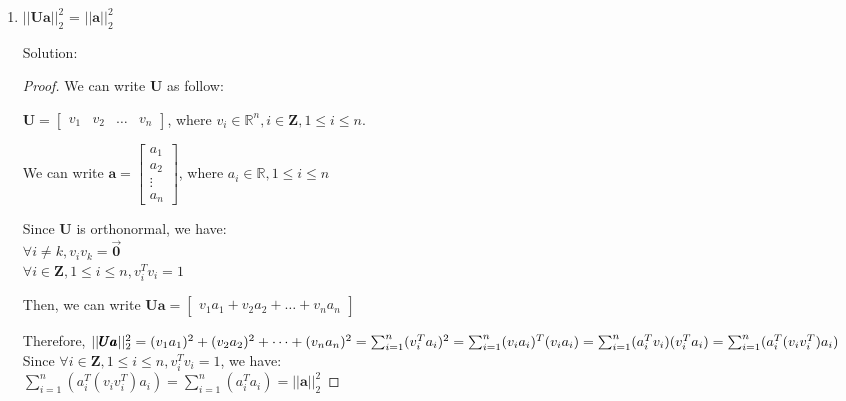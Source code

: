 \documentclass[12pt]{article}
\newcommand{\solu}{{\color{blue} Solution:}}
\newcommand{\Rbb}{\mathbb{R}}
\newcommand{\Z}{\mathbf{Z}}
\newcommand{\Upmb}{\pmb{U}}
\begin{document}
\begin{enumerate}
\begin{enumerate}
\begin{proof}
                        Therefore, trace($\pmb{a}\pmb{a}^T$) = $a_1 \cdot a_1 + a_2 \cdot a_2 + \cdots + a_n \cdot a_n$ = $\sum_{i = 1}^{n} a_i^2$ = $||\pmb{a}||^2_2$

                        Thus, trace($\pmb{a}\pmb{a}^T$) = $||\pmb{a}||^2_2$
                    \end{proof}

              \item $||\Upmb \pmb{a}||_2^2$ = $||\pmb{a}||_2^2$

                    \solu
                    \begin{proof}

                        We can write $\Upmb$ as follow:

                        $
                            \Upmb =
                            \begin{bmatrix}
                                v_1 & v_2 & \dots & v_n
                            \end{bmatrix}
                        $, where $v_i \in \Rbb^n, i\in \Z, 1 \le i \le n$.

                        We can write $\pmb{a} = \begin{bmatrix}
                            a_1 \\ a_2 \\ \vdots \\ a_n
                        \end{bmatrix}$, where $a_i \in \Rbb, 1 \le i \le n$

                        Since $\Upmb$ is orthonormal, we have:\\
                        $\forall i \ne k, v_iv_k = \overrightarrow{\pmb{0}}$\\
                        $\forall i\in \Z, 1 \le i \le n, v_i^T v_i = 1$

                        Then, we can write $\Upmb\pmb{a} =
                            \begin{bmatrix}
                                v_1a_1 + v_2a_2 + \dots + v_na_n
                            \end{bmatrix}$

                        Therefore, $||\Upmb\pmb{a}||^2_2 = (v_1a_1)^2 + (v_2a_2)^2 + \dots + (v_na_n)^2 \\
                            = \sum_{i = 1}^n (v_i^Ta_i)^2 = \sum_{i = 1}^n (v_ia_i)^T(v_ia_i) = \sum_{i = 1}^n (a_i^Tv_i)(v_i^Ta_i) \\
                            = \sum_{i = 1}^n (a_i^T(v_iv_i^T)a_i)$ \\
                        Since $\forall i\in \Z, 1 \le i \le n, v_i^T v_i = 1$, we have:\\
                        $\sum_{i = 1}^n (a_i^T(v_iv_i^T)a_i) = \sum_{i = 1}^n (a_i^Ta_i) = ||\pmb{a}||^2_2$


\end{proof}
\end{enumerate}
\end{enumerate}
\end{document}
